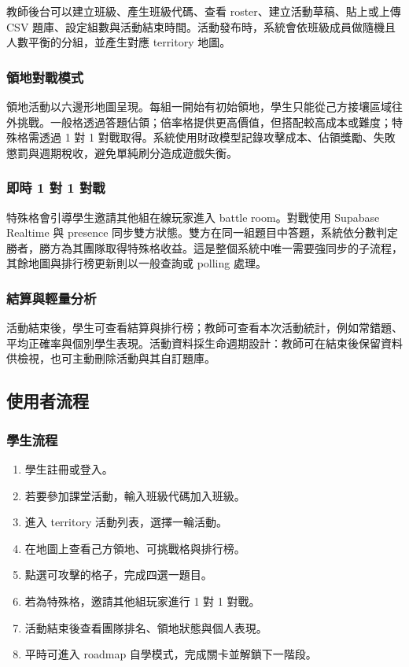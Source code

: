 \documentclass[12pt,a4paper]{article}
\begin{document}
教師後台可以建立班級、產生班級代碼、查看 roster、建立活動草稿、貼上或上傳 CSV 題庫、設定組數與活動結束時間。活動發布時，系統會依班級成員做隨機且人數平衡的分組，並產生對應 territory 地圖。

\subsubsection{領地對戰模式}

領地活動以六邊形地圖呈現。每組一開始有初始領地，學生只能從己方接壤區域往外挑戰。一般格透過答題佔領；倍率格提供更高價值，但搭配較高成本或難度；特殊格需透過 1 對 1 對戰取得。系統使用財政模型記錄攻擊成本、佔領獎勵、失敗懲罰與週期稅收，避免單純刷分造成遊戲失衡。

\subsubsection{即時 1 對 1 對戰}

特殊格會引導學生邀請其他組在線玩家進入 battle room。對戰使用 Supabase Realtime 與 presence 同步雙方狀態。雙方在同一組題目中答題，系統依分數判定勝者，勝方為其團隊取得特殊格收益。這是整個系統中唯一需要強同步的子流程，其餘地圖與排行榜更新則以一般查詢或 polling 處理。

\subsubsection{結算與輕量分析}

活動結束後，學生可查看結算與排行榜；教師可查看本次活動統計，例如常錯題、平均正確率與個別學生表現。活動資料採生命週期設計：教師可在結束後保留資料供檢視，也可主動刪除活動與其自訂題庫。

\subsection{使用者流程}

\subsubsection{學生流程}

\begin{enumerate}
  \item 學生註冊或登入。
  \item 若要參加課堂活動，輸入班級代碼加入班級。
  \item 進入 territory 活動列表，選擇一輪活動。
  \item 在地圖上查看己方領地、可挑戰格與排行榜。
  \item 點選可攻擊的格子，完成四選一題目。
  \item 若為特殊格，邀請其他組玩家進行 1 對 1 對戰。
  \item 活動結束後查看團隊排名、領地狀態與個人表現。
  \item 平時可進入 roadmap 自學模式，完成關卡並解鎖下一階段。
\end{enumerate}
\end{document}
